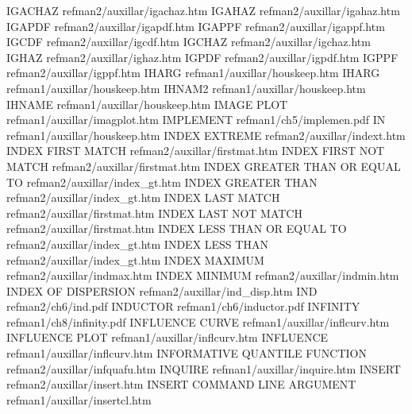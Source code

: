 IGACHAZ                                 refman2/auxillar/igachaz.htm
IGAHAZ                                  refman2/auxillar/igahaz.htm
IGAPDF                                  refman2/auxillar/igapdf.htm
IGAPPF                                  refman2/auxillar/igappf.htm
IGCDF                                   refman2/auxillar/igcdf.htm
IGCHAZ                                  refman2/auxillar/igchaz.htm
IGHAZ                                   refman2/auxillar/ighaz.htm
IGPDF                                   refman2/auxillar/igpdf.htm
IGPPF                                   refman2/auxillar/igppf.htm
IHARG                                   refman1/auxillar/houskeep.htm
IHARG                                   refman1/auxillar/houskeep.htm
IHNAM2                                  refman1/auxillar/houskeep.htm
IHNAME                                  refman1/auxillar/houskeep.htm
IMAGE PLOT                              refman1/auxillar/imagplot.htm
IMPLEMENT                               refman1/ch5/implemen.pdf
IN                                      refman1/auxillar/houskeep.htm
INDEX EXTREME                           refman2/auxillar/indext.htm
INDEX FIRST MATCH                       refman2/auxillar/firstmat.htm
INDEX FIRST NOT MATCH                   refman2/auxillar/firstmat.htm
INDEX GREATER THAN OR EQUAL TO          refman2/auxillar/index_gt.htm
INDEX GREATER THAN                      refman2/auxillar/index_gt.htm
INDEX LAST MATCH                        refman2/auxillar/firstmat.htm
INDEX LAST NOT MATCH                    refman2/auxillar/firstmat.htm
INDEX LESS THAN OR EQUAL TO             refman2/auxillar/index_gt.htm
INDEX LESS THAN                         refman2/auxillar/index_gt.htm
INDEX MAXIMUM                           refman2/auxillar/indmax.htm
INDEX MINIMUM                           refman2/auxillar/indmin.htm
INDEX OF DISPERSION                     refman2/auxillar/ind_disp.htm
IND                                     refman2/ch6/ind.pdf
INDUCTOR                                refman1/ch6/inductor.pdf
INFINITY                                refman1/ch8/infinity.pdf
INFLUENCE CURVE                         refman1/auxillar/inflcurv.htm
INFLUENCE PLOT                          refman1/auxillar/inflcurv.htm
INFLUENCE                               refman1/auxillar/inflcurv.htm
INFORMATIVE QUANTILE FUNCTION           refman2/auxillar/infquafu.htm
INQUIRE                                 refman1/auxillar/inquire.htm
INSERT                                  refman2/auxillar/insert.htm
INSERT COMMAND LINE ARGUMENT            refman1/auxillar/insertcl.htm
